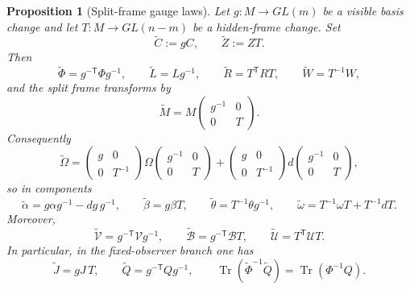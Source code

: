 \documentclass[11pt,a4paper]{article}
\numberwithin{equation}{section}
\DeclareMathOperator{\Tr}{Tr}
\theoremstyle{thmcompact}
\newtheorem{proposition}[theorem]{Proposition}
\theoremstyle{remark}
\begin{document}
\begin{proposition}[Split-frame gauge laws]
\label{prop:split-frame-gauge}
Let $g:M\to GL(m)$ be a visible basis change and let $T:M\to GL(n-m)$ be a hidden-frame change. Set
\[
\widetilde C:=gC,
\qquad
\widetilde Z:=ZT.
\]
Then
\[
\widetilde\Phi=g^{-\mathsf T}\Phi g^{-1},
\qquad
\widetilde L=Lg^{-1},
\qquad
\widetilde R=T^{\mathsf T}RT,
\qquad
\widetilde W=T^{-1}W,
\]
and the split frame transforms by
\[
\widetilde M
=
M
\begin{pmatrix}
g^{-1} & 0\\
0 & T
\end{pmatrix}.
\]
Consequently
\begin{equation}
\widetilde\Omega
=
\begin{pmatrix}
g & 0\\
0 & T^{-1}
\end{pmatrix}
\Omega
\begin{pmatrix}
g^{-1} & 0\\
0 & T
\end{pmatrix}
+
\begin{pmatrix}
g & 0\\
0 & T^{-1}
\end{pmatrix}
d\!\begin{pmatrix}
g^{-1} & 0\\
0 & T
\end{pmatrix},
\label{eq:Omega-gauge-law}
\end{equation}
so in components
\begin{equation}
\widetilde\alpha=g\alpha g^{-1}-dg\,g^{-1},
\qquad
\widetilde\beta=g\beta T,
\qquad
\widetilde\theta=T^{-1}\theta g^{-1},
\qquad
\widetilde\omega=T^{-1}\omega T+T^{-1}dT.
\label{eq:split-frame-connection-gauge}
\end{equation}
Moreover,
\begin{equation}
\widetilde{\mathcal V}=g^{-\mathsf T}\mathcal V g^{-1},
\qquad
\widetilde{\mathcal B}=g^{-\mathsf T}\mathcal B T,
\qquad
\widetilde{\mathcal U}=T^{\mathsf T}\mathcal U T.
\label{eq:split-frame-metric-gauge}
\end{equation}
In particular, in the fixed-observer branch one has
\begin{equation}
\widetilde J=gJ\,T,
\qquad
\widetilde Q=g^{-\mathsf T}Qg^{-1},
\qquad
\Tr(\widetilde\Phi^{-1}\widetilde Q)=\Tr(\Phi^{-1}Q).
\label{eq:JQ-gauge-law}
\end{equation}
\end{proposition}
\end{document}
